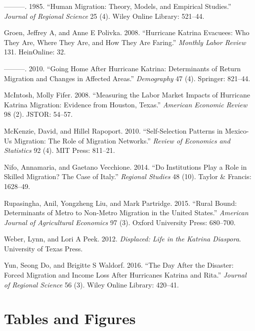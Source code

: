 \documentclass[]{article}
\begin{document}
\hypertarget{ref-greenwood1985human}{}
---------. 1985. ``Human Migration: Theory, Models, and Empirical
Studies.'' \emph{Journal of Regional Science} 25 (4). Wiley Online
Library: 521--44.

\hypertarget{ref-groen2008hurricane}{}
Groen, Jeffrey A, and Anne E Polivka. 2008. ``Hurricane Katrina
Evacuees: Who They Are, Where They Are, and How They Are Faring.''
\emph{Monthly Labor Review} 131. HeinOnline: 32.

\hypertarget{ref-groen2010going}{}
---------. 2010. ``Going Home After Hurricane Katrina: Determinants of
Return Migration and Changes in Affected Areas.'' \emph{Demography} 47
(4). Springer: 821--44.

\hypertarget{ref-mcintosh2008measuring}{}
McIntosh, Molly Fifer. 2008. ``Measuring the Labor Market Impacts of
Hurricane Katrina Migration: Evidence from Houston, Texas.''
\emph{American Economic Review} 98 (2). JSTOR: 54--57.

\hypertarget{ref-mckenzie2010self}{}
McKenzie, David, and Hillel Rapoport. 2010. ``Self-Selection Patterns in
Mexico-Us Migration: The Role of Migration Networks.'' \emph{Review of
Economics and Statistics} 92 (4). MIT Press: 811--21.

\hypertarget{ref-nifo2014institutions}{}
Nifo, Annamaria, and Gaetano Vecchione. 2014. ``Do Institutions Play a
Role in Skilled Migration? The Case of Italy.'' \emph{Regional Studies}
48 (10). Taylor \& Francis: 1628--49.

\hypertarget{ref-rupasingha2015rural}{}
Rupasingha, Anil, Yongzheng Liu, and Mark Partridge. 2015. ``Rural
Bound: Determinants of Metro to Non-Metro Migration in the United
States.'' \emph{American Journal of Agricultural Economics} 97 (3).
Oxford University Press: 680--700.

\hypertarget{ref-weber2012displaced}{}
Weber, Lynn, and Lori A Peek. 2012. \emph{Displaced: Life in the Katrina
Diaspora}. University of Texas Press.

\hypertarget{ref-yun2016day}{}
Yun, Seong Do, and Brigitte S Waldorf. 2016. ``The Day After the
Disaster: Forced Migration and Income Loss After Hurricanes Katrina and
Rita.'' \emph{Journal of Regional Science} 56 (3). Wiley Online Library:
420--41.

\clearpage

\section{Tables and Figures}\label{tables-and-figures}
\end{document}

